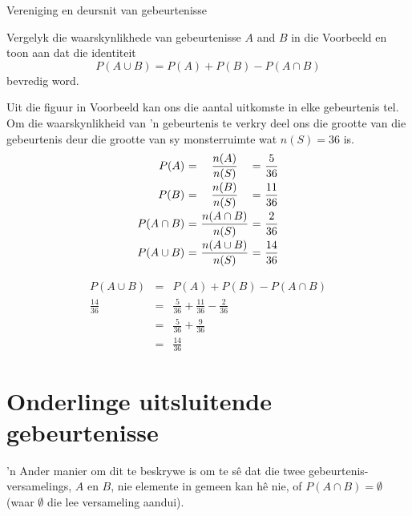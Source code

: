 \begin{wex}{Vereniging en deursnit van gebeurtenisse}{
  Vergelyk die waarskynlikhede van gebeurtenisse $A$ and $B$ in die Voorbeeld  en toon aan dat die identiteit 
\[P(A \cup B) = P(A) + P(B) - P(A \cap B)\]
bevredig word.

}{
  
Uit die figuur in Voorbeeld  kan ons die aantal uitkomste in elke gebeurtenis tel. Om die waarskynlikheid van 'n gebeurtenis te verkry deel ons die grootte van die gebeurtenis deur die grootte van sy monsterruimte wat $n(S)=36$ is.
  \[\begin{array}{r@{$\ =\ $}c@{$\ =\ $}l}
    P(A)        & \dfrac{n(A)}{n(S)}        & \dfrac{5}{36}  \\[8pt]
    P(B)        & \dfrac{n(B)}{n(S)}        & \dfrac{11}{36} \\[8pt]
    P(A \cap B) & \dfrac{n(A \cap B)}{n(S)} & \dfrac{2}{36}  \\[8pt]
    P(A \cup B) & \dfrac{n(A \cup B)}{n(S)} & \dfrac{14}{36}
  \end{array}\]


  \begin{eqnarray*}
    P(A \cup B) &=& P(A) + P(B) - P(A \cap B) \\
    \frac{14}{36} &=& \frac{5}{36} + \frac{11}{36} - \frac{2}{36} \\
    &=& \frac{5}{36} + \frac{9}{36} \\
    &=& \frac{14}{36} \qquad\qquad
  \end{eqnarray*}
}
\end{wex}

\section{Onderlinge uitsluitende gebeurtenisse}

'n Ander manier om dit te beskrywe is om te s\^e dat die twee gebeurtenis-versamelings, $A$ en $B$, nie elemente in gemeen kan h\^e nie, of $P(A \cap B) = \emptyset$
(waar $\emptyset$ die lee versameling aandui).

